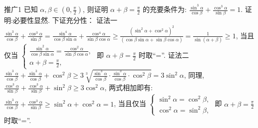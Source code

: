 推广1 已知 $\alpha, \beta \in\left(0, \frac{\pi}{2}\right)$, 则证明 $\alpha+\beta=\frac{\pi}{2}$ 的充要条件为: $\frac{\sin ^3 \alpha}{\cos \beta}+ \frac{\cos ^3 \alpha}{\sin \beta}=1$.
证明:必要性显然.
下证充分性：
证法一 $\frac{\sin ^3 \alpha}{\cos \beta}+\frac{\cos ^3 \alpha}{\sin \beta}=\frac{\sin ^4 \alpha}{\cos \beta \sin \alpha}+\frac{\cos ^4 \alpha}{\sin \beta \cos \alpha} \geqslant \frac{\left(\sin ^2 \alpha+\cos ^2 \alpha\right)^2}{(\cos \beta \sin \alpha+\sin \beta \cos \alpha)} =\frac{1}{\sin (\alpha+\beta)} \geqslant 1$, 当且仅当 $\left\{\begin{array}{l}\frac{\sin ^2 \alpha}{\cos \beta \sin \alpha}=\frac{\cos ^2 \alpha}{\sin \beta \cos \alpha}, \\ \alpha+\beta=\frac{\pi}{2},\end{array}\right.$ 即 $\alpha+\beta=\frac{\pi}{2}$ 时取“=”. 
证法二 $\frac{\sin ^3 \alpha}{\cos \beta}+\frac{\sin ^3 \alpha}{\cos \beta}+\cos ^2 \beta \geqslant 3 \sqrt[3]{\frac{\sin ^3 \alpha}{\cos \beta} \cdot \frac{\sin ^3 \alpha}{\cos \beta} \cdot \cos ^2 \beta}=3 \sin ^2 \alpha$, 同理, $\frac{\cos ^3 \alpha}{\sin \beta}+\frac{\cos ^3 \alpha}{\sin \beta}+\sin ^2 \beta \geqslant 3 \cos ^2 \alpha$, 两式相加即有: $\frac{\sin ^3 \alpha}{\cos \beta}+\frac{\cos ^3 \alpha}{\sin \beta} \geqslant \sin ^2 \alpha+\cos ^2 \alpha=1$, 当且仅当 $\left\{\begin{array}{l}\sin ^2 \alpha=\cos ^2 \beta, \\ \cos ^2 \alpha=\sin ^2 \beta,\end{array}\right.$ 即 $\alpha+\beta=\frac{\pi}{2}$ 时取“=”. 



